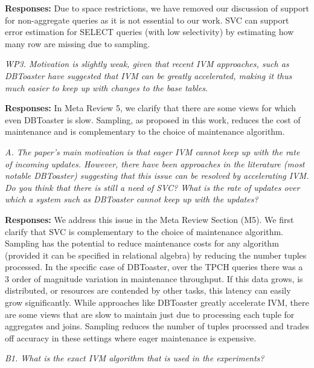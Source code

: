 \vspace{.25em}

{\bf Responses:} Due to space restrictions, we have removed our discussion of support for non-aggregate queries as it is not essential to our work. SVC can support error estimation for SELECT queries (with low selectivity) by estimating how many row are missing due to sampling.

\vspace{1em}
\emph{WP3. Motivation is slightly weak, given that recent IVM approaches, such as DBToaster have suggested that IVM can be greatly accelerated, making it thus much easier to keep up with changes to the base tables.}

\vspace{.25em}

{\bf Responses:} In Meta Review 5, we clarify that there are some views for which even DBToaster is slow. Sampling, as proposed in this work, reduces the cost of maintenance and is complementary to the choice of maintenance algorithm.

\vspace{1em}
\emph{A. The paper's main motivation is that eager IVM cannot keep up with the rate of incoming updates. However, there have been approaches in the literature (most notable DBToaster) suggesting that this issue can be resolved by accelerating IVM. Do you think that there is still a need of SVC? What is the rate of updates over which a system such as DBToaster cannot keep up with the updates?}

\vspace{.25em}

{\bf Responses:} 
We address this issue in the Meta Review Section (M5). We first clarify that SVC is complementary to the choice of maintenance algorithm. Sampling has the potential to reduce maintenance costs for any algorithm (provided it can be specified in relational algebra) by reducing the number tuples processed. In the specific case of DBToaster, over the TPCH queries there was a 3 order of magnitude variation in maintenance throughput. If this data grows, is distributed, or resources are contended by other tasks, this latency can easily grow significantly. While approaches like DBToaster greatly accelerate IVM, there are some views that are slow to maintain just due to processing each tuple for aggregates and joins. Sampling reduces the number of tuples processed and trades off accuracy in these settings where eager maintenance is expensive. 

\vspace{1em}
\emph{B1. What is the exact IVM algorithm that is used in the experiments?}

